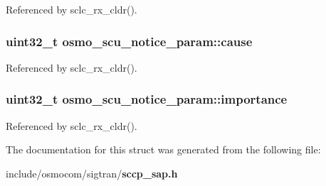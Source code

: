 Referenced by sclc\+\_\+rx\+\_\+cldr().

\subsubsection[{cause}]{\setlength{\rightskip}{0pt plus 5cm}uint32\+\_\+t osmo\+\_\+scu\+\_\+notice\+\_\+param\+::cause}\label{structosmo__scu__notice__param_a2cd31c16112b585c7b821ae7893c9813}


Referenced by sclc\+\_\+rx\+\_\+cldr().

\subsubsection[{importance}]{\setlength{\rightskip}{0pt plus 5cm}uint32\+\_\+t osmo\+\_\+scu\+\_\+notice\+\_\+param\+::importance}\label{structosmo__scu__notice__param_a3783102398c81e62900273368f906bc6}


Referenced by sclc\+\_\+rx\+\_\+cldr().



The documentation for this struct was generated from the following file\+:\begin{DoxyCompactItemize}
\item 
include/osmocom/sigtran/{\bf sccp\+\_\+sap.\+h}\end{DoxyCompactItemize}
